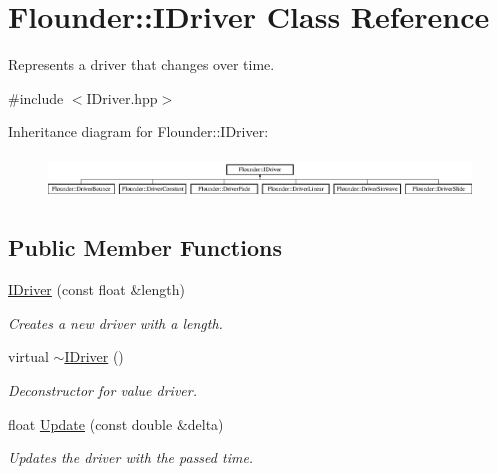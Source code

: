 \hypertarget{class_flounder_1_1_i_driver}{}\section{Flounder\+:\+:I\+Driver Class Reference}
\label{class_flounder_1_1_i_driver}


Represents a driver that changes over time.  




{\ttfamily \#include $<$I\+Driver.\+hpp$>$}

Inheritance diagram for Flounder\+:\+:I\+Driver\+:\begin{figure}[H]
\begin{center}
\leavevmode
\includegraphics[height=1.152263cm]{class_flounder_1_1_i_driver}
\end{center}
\end{figure}
\subsection*{Public Member Functions}
\begin{DoxyCompactItemize}
\item 
\hyperlink{class_flounder_1_1_i_driver_a76d7165848c3b263f50048014e03818a}{I\+Driver} (const float \&length)
\begin{DoxyCompactList}\small\item\em Creates a new driver with a length. \end{DoxyCompactList}\item 
virtual \hyperlink{class_flounder_1_1_i_driver_a3cca0f4835cbb3ea6ad9388bd41392f6}{$\sim$\+I\+Driver} ()
\begin{DoxyCompactList}\small\item\em Deconstructor for value driver. \end{DoxyCompactList}\item 
float \hyperlink{class_flounder_1_1_i_driver_af7831c5f86843234aa6815ccc5612471}{Update} (const double \&delta)
\begin{DoxyCompactList}\small\item\em Updates the driver with the passed time. \end{DoxyCompactList}\end{DoxyCompactItemize}
